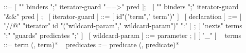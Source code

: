 \begin{syntax}
  [ { iterator } ] ::= [ { "\forall" binders ";"  iterator-guard "==>" pred } ];
       | [ { "\exists" binders ";" iterator-guard "&&" pred } ] ;
  \
  [ { iterator-guard } ] ::= [ { id"("term"," term")" } ]
  \
  [ { declaration } ] ::= [ { "//@" "iterator" id "("wildcard-param"," 
    wildcard-param")" ":" } ] ;
  [ { "nexts" terms ";" "guards" predicates ";" } ]
  \
  [ { wildcard-param } ] ::= { parameter } ;
  | [ { "_" } ]
  \
  { terms } ::= { term (, term)* }
  \
  { predicates } ::= { predicate (, predicate)* }
\end{syntax}
